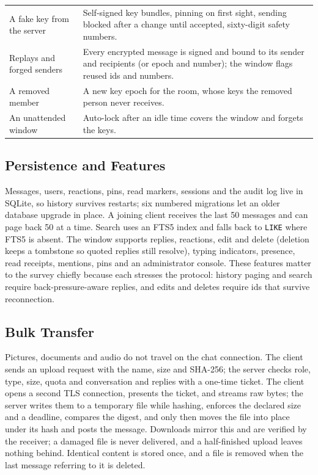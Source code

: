 \documentclass[conference]{IEEEtran}
\newcommand{\code}[1]{\texttt{#1}}
\begin{document}
\begin{table}[t]
\begin{tabularx}{\textwidth}{@{}>{\raggedright\arraybackslash}p{3.6cm} Y@{}}
A fake key from the server & Self-signed key bundles, pinning on first sight, sending blocked after a change until accepted, sixty-digit safety numbers. \\
Replays and forged senders & Every encrypted message is signed and bound to its sender and recipients (or epoch and number); the window flags reused ids and numbers. \\
A removed member & A new key epoch for the room, whose keys the removed person never receives. \\
An unattended window & Auto-lock after an idle time covers the window and forgets the keys. \\
\bottomrule
\end{tabularx}
\end{table}

\subsection{Persistence and Features}
Messages, users, reactions, pins, read markers, sessions and the audit log live in SQLite, so history survives restarts; six numbered migrations let an older database upgrade in place. A joining client receives the last 50 messages and can page back 50 at a time. Search uses an FTS5 index and falls back to \code{LIKE} where FTS5 is absent. The window supports replies, reactions, edit and delete (deletion keeps a tombstone so quoted replies still resolve), typing indicators, presence, read receipts, mentions, pins and an administrator console. These features matter to the survey chiefly because each stresses the protocol: history paging and search require back-pressure-aware replies, and edits and deletes require ids that survive reconnection.

\subsection{Bulk Transfer}
Pictures, documents and audio do not travel on the chat connection. The client sends an upload request with the name, size and SHA-256; the server checks role, type, size, quota and conversation and replies with a one-time ticket. The client opens a second TLS connection, presents the ticket, and streams raw bytes; the server writes them to a temporary file while hashing, enforces the declared size and a deadline, compares the digest, and only then moves the file into place under its hash and posts the message. Downloads mirror this and are verified by the receiver; a damaged file is never delivered, and a half-finished upload leaves nothing behind. Identical content is stored once, and a file is removed when the last message referring to it is deleted.
\end{document}
